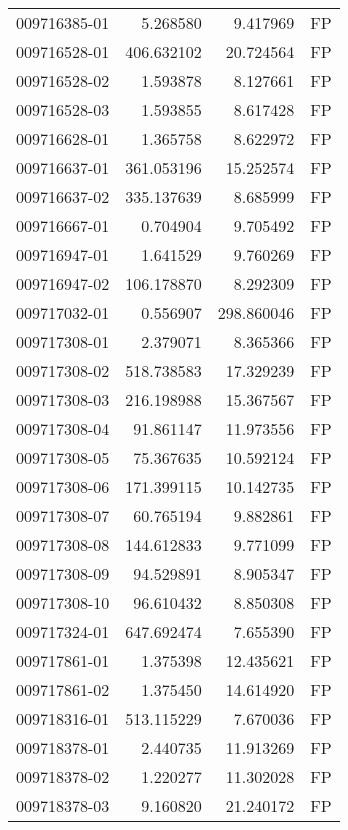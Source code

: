 \begin{tabular}{lrrl}
009716385-01 &    5.268580 &       9.417969 &   FP \\
009716528-01 &  406.632102 &      20.724564 &   FP \\
009716528-02 &    1.593878 &       8.127661 &   FP \\
009716528-03 &    1.593855 &       8.617428 &   FP \\
009716628-01 &    1.365758 &       8.622972 &   FP \\
009716637-01 &  361.053196 &      15.252574 &   FP \\
009716637-02 &  335.137639 &       8.685999 &   FP \\
009716667-01 &    0.704904 &       9.705492 &   FP \\
009716947-01 &    1.641529 &       9.760269 &   FP \\
009716947-02 &  106.178870 &       8.292309 &   FP \\
009717032-01 &    0.556907 &     298.860046 &   FP \\
009717308-01 &    2.379071 &       8.365366 &   FP \\
009717308-02 &  518.738583 &      17.329239 &   FP \\
009717308-03 &  216.198988 &      15.367567 &   FP \\
009717308-04 &   91.861147 &      11.973556 &   FP \\
009717308-05 &   75.367635 &      10.592124 &   FP \\
009717308-06 &  171.399115 &      10.142735 &   FP \\
009717308-07 &   60.765194 &       9.882861 &   FP \\
009717308-08 &  144.612833 &       9.771099 &   FP \\
009717308-09 &   94.529891 &       8.905347 &   FP \\
009717308-10 &   96.610432 &       8.850308 &   FP \\
009717324-01 &  647.692474 &       7.655390 &   FP \\
009717861-01 &    1.375398 &      12.435621 &   FP \\
009717861-02 &    1.375450 &      14.614920 &   FP \\
009718316-01 &  513.115229 &       7.670036 &   FP \\
009718378-01 &    2.440735 &      11.913269 &   FP \\
009718378-02 &    1.220277 &      11.302028 &   FP \\
009718378-03 &    9.160820 &      21.240172 &   FP \\

\end{tabular}
